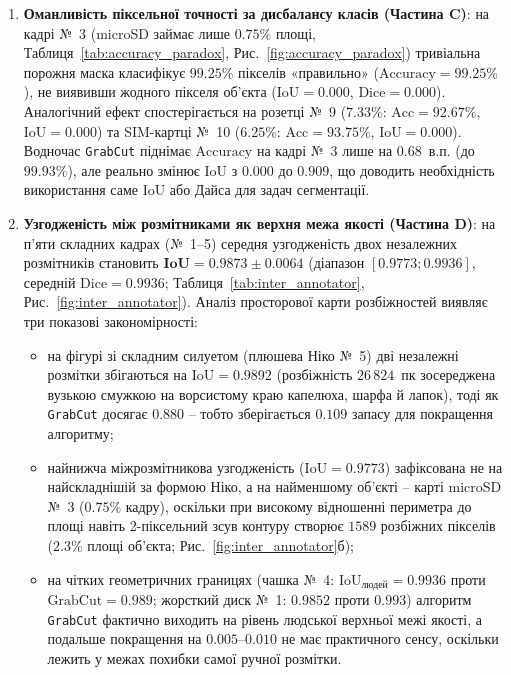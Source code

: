\documentclass[14pt, a4paper]{extarticle}
\begin{document}
\begin{enumerate}
    \item \textbf{Оманливість піксельної точності за дисбалансу класів (Частина C)}: на кадрі №~3 (microSD займає лише $0.75\%$ площі, Таблиця~\ref{tab:accuracy_paradox}, Рис.~\ref{fig:accuracy_paradox}) тривіальна порожня маска класифікує $99.25\%$ пікселів «правильно» ($\text{Accuracy} = \mathbf{99.25\%}$), не виявивши жодного пікселя об'єкта ($\text{IoU} = \mathbf{0.000}$, $\text{Dice} = 0.000$). Аналогічний ефект спостерігається на розетці №~9 ($7.33\%$: $\text{Acc} = 92.67\%$, $\text{IoU} = 0.000$) та SIM-картці №~10 ($6.25\%$: $\text{Acc} = 93.75\%$, $\text{IoU} = 0.000$). Водночас \texttt{GrabCut} піднімає $\text{Accuracy}$ на кадрі №~3 лише на $0.68$~в.п. (до $99.93\%$), але реально змінює $\text{IoU}$ з $0.000$ до $\mathbf{0.909}$, що доводить необхідність використання саме $\text{IoU}$ або Дайса для задач сегментації.

    \item \textbf{Узгодженість між розмітниками як верхня межа якості (Частина D)}: на п'яти складних кадрах (№~1--5) середня узгодженість двох незалежних розмітників становить $\mathbf{\text{IoU} = 0.9873 \pm 0.0064}$ (діапазон $[0.9773; 0.9936]$, середній $\text{Dice} = 0.9936$; Таблиця~\ref{tab:inter_annotator}, Рис.~\ref{fig:inter_annotator}). Аналіз просторової карти розбіжностей виявляє три показові закономірності:
    \begin{itemize}
        \item на фігурі зі складним силуетом (плюшева Ніко №~5) дві незалежні розмітки збігаються на $\text{IoU} = \mathbf{0.9892}$ (розбіжність $26\,824$~пк зосереджена вузькою смужкою на ворсистому краю капелюха, шарфа й лапок), тоді як \texttt{GrabCut} досягає $0.880$ -- тобто зберігається $0.109$ запасу для покращення алгоритму;
        \item найнижча міжрозмітникова узгодженість ($\text{IoU} = \mathbf{0.9773}$) зафіксована не на найскладнішій за формою Ніко, а на найменшому об'єкті -- карті microSD №~3 ($0.75\%$ кадру), оскільки при високому відношенні периметра до площі навіть 2-піксельний зсув контуру створює $1589$ розбіжних пікселів ($2.3\%$ площі об'єкта; Рис.~\ref{fig:inter_annotator}б);
        \item на чітких геометричних границях (чашка №~4: $\text{IoU}_{\text{людей}} = 0.9936$ проти $\text{GrabCut} = 0.989$; жорсткий диск №~1: $0.9852$ проти $0.993$) алгоритм \texttt{GrabCut} фактично виходить на рівень людської верхньої межі якості, а подальше покращення на $0.005$--$0.010$ не має практичного сенсу, оскільки лежить у межах похибки самої ручної розмітки.
    \end{itemize}


\end{enumerate}
\end{document}
